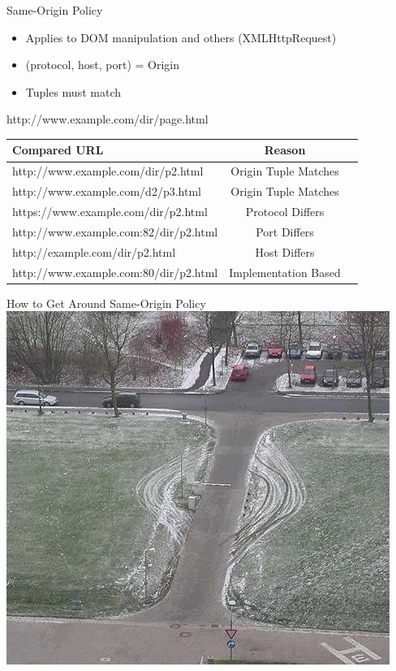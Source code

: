 \documentclass[11pt]{beamer}
\begin{document}
\begin{frame}{Same-Origin Policy}
  \begin{itemize}
  \item Applies to DOM manipulation and others (XMLHttpRequest)\pause
  \item (protocol, host, port) = Origin\pause
  \item Tuples must match\pause
  \end{itemize}
  http://www.example.com/dir/page.html\pause\\
  \begin{tabular}{|l|c|l|}
    \hline
    Compared URL & Reason\\
    \hline
    http://www.example.com/dir/p2.html\pause & Origin Tuple Matches\\
    http://www.example.com/d2/p3.html\pause & Origin Tuple Matches\\
    https://www.example.com/dir/p2.html\pause & Protocol Differs\\
    http://www.example.com:82/dir/p2.html\pause & Port Differs\\
    http://example.com/dir/p2.html\pause & Host Differs\\
    http://www.example.com:80/dir/p2.html\pause & Implementation Based\\
    \hline
  \end{tabular}
\end{frame}

\begin{frame}{How to Get Around Same-Origin Policy}
  \includegraphics[keepaspectratio=true,width=\framewidth]{circumvent.jpeg}
\end{frame}
\end{document}
